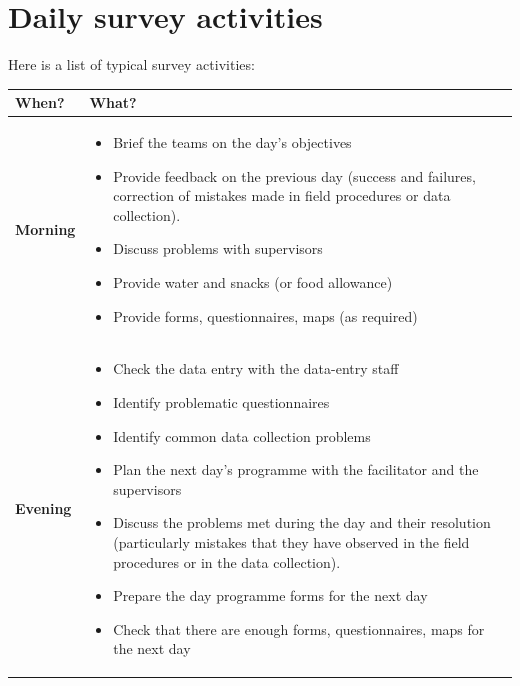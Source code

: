 \documentclass[12pt,a4paper]{book}
\providecommand{\tightlist}{%
  \setlength{\itemsep}{0pt}\setlength{\parskip}{0pt}}
\theoremstyle{definition}
\theoremstyle{definition}
\theoremstyle{definition}
\theoremstyle{remark}
\begin{document}
\hypertarget{daily-survey-activities}{%
\section{Daily survey activities}\label{daily-survey-activities}}

Here is a list of typical survey activities:

\begin{longtable}[]{@{}ll@{}}
\toprule
\begin{minipage}[b]{0.25\columnwidth}\raggedright
\textbf{When?}\strut
\end{minipage} & \begin{minipage}[b]{0.70\columnwidth}\raggedright
\textbf{What?}\strut
\end{minipage}\tabularnewline
\midrule
\endhead
\begin{minipage}[t]{0.48\columnwidth}\raggedright
\textbf{Morning}\strut
\end{minipage} & \begin{minipage}[t]{0.48\columnwidth}\raggedright
\begin{itemize}
\tightlist
\item
  Brief the teams on the day's objectives
\item
  Provide feedback on the previous day (success and failures, correction
  of mistakes made in field procedures or data collection).
\item
  Discuss problems with supervisors
\item
  Provide water and snacks (or food allowance)
\item
  Provide forms, questionnaires, maps (as required)
\end{itemize}\strut
\end{minipage}\tabularnewline
\begin{minipage}[t]{0.48\columnwidth}\raggedright
\textbf{Evening}\strut
\end{minipage} & \begin{minipage}[t]{0.48\columnwidth}\raggedright
\begin{itemize}
\tightlist
\item
  Check the data entry with the data-entry staff
\item
  Identify problematic questionnaires
\item
  Identify common data collection problems
\item
  Plan the next day's programme with the facilitator and the supervisors
\item
  Discuss the problems met during the day and their resolution
  (particularly mistakes that they have observed in the field procedures
  or in the data collection).
\item
  Prepare the day programme forms for the next day
\item
  Check that there are enough forms, questionnaires, maps for the next
  day
\end{itemize}\strut
\end{minipage}\tabularnewline
\bottomrule
\end{longtable}
\end{document}
